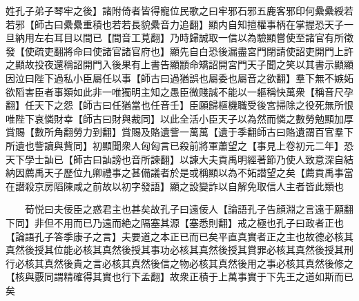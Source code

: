 姓孔子弟子琴牢之後】諸附倚者皆得寵位民歌之曰牢邪石邪五鹿客邪印何纍纍綬若若邪【師古曰纍纍重積也若若長貌纍音力追翻】顯内自知擅權事柄在掌握恐天子一旦納用左右耳目以間已【間音工莧翻】乃時歸誠取一信以為驗顯嘗使至諸官有所徵發【使疏吏翻將命曰使諸官諸官府也】顯先自白恐後漏盡宮門閉請使詔吏開門上許之顯故投夜還稱詔開門入後果有上書告顯顓命矯詔開宮門天子聞之笑以其書示顯顯因泣曰陛下過私小臣屬任以事【師古曰過猶誤也屬委也屬音之欲翻】羣下無不嫉妬欲䧟害臣者事類如此非一唯獨明主知之愚臣微賤誠不能以一軀稱快萬衆【稱音尺孕翻】任天下之怨【師古曰任猶當也任音壬】臣願歸樞機職受後宮掃除之役死無所恨唯陛下哀憐財幸【師古曰財與裁同】以此全活小臣天子以為然而憐之數勞勉顯加厚賞賜【數所角翻勞力到翻】賞賜及賂遺訾一萬萬【遺于季翻師古曰賂遺謂百官羣下所遺也訾讀與貲同】初顯聞衆人匈匈言已殺前將軍蕭望之【事見上卷初元二年】恐天下學士訕已【師古曰訕謗也音所諫翻】以諫大夫貢禹明經著節乃使人致意深自結納因薦禹天子歷位九卿禮事之甚備議者於是或稱顯以為不妬譛望之矣【薦貢禹事當在譛殺京房䧟陳咸之前故以初字發語】顯之設變詐以自解免取信人主者皆此類也

　　荀悦曰夫佞臣之惑君主也甚矣故孔子曰遠佞人【論語孔子告顔淵之言遠于願翻下同】非但不用而已乃遠而絶之隔塞其源【塞悉則翻】戒之極也孔子曰政者正也【論語孔子答季康子之言】夫要道之本正已而已矣平直真實者正之主也故德必核其真然後授其位能必核其真然後授其事功必核其真然後授其賞罪必核其真然後授其刑行必核其真然後貴之言必核其真然後信之物必核其真然後用之事必核其真然後修之【核與覈同謂精確得其實也行下孟翻】故衆正積于上萬事實于下先王之道如斯而已矣

